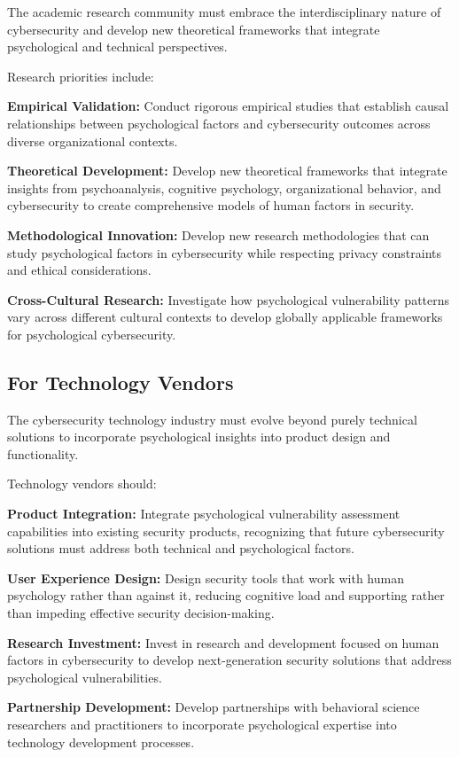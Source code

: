 \documentclass[10pt, twocolumn]{article}
\begin{document}
The academic research community must embrace the interdisciplinary nature of cybersecurity and develop new theoretical frameworks that integrate psychological and technical perspectives.

Research priorities include:

\textbf{Empirical Validation:} Conduct rigorous empirical studies that establish causal relationships between psychological factors and cybersecurity outcomes across diverse organizational contexts.

\textbf{Theoretical Development:} Develop new theoretical frameworks that integrate insights from psychoanalysis, cognitive psychology, organizational behavior, and cybersecurity to create comprehensive models of human factors in security.

\textbf{Methodological Innovation:} Develop new research methodologies that can study psychological factors in cybersecurity while respecting privacy constraints and ethical considerations.

\textbf{Cross-Cultural Research:} Investigate how psychological vulnerability patterns vary across different cultural contexts to develop globally applicable frameworks for psychological cybersecurity.

\subsection{For Technology Vendors}

The cybersecurity technology industry must evolve beyond purely technical solutions to incorporate psychological insights into product design and functionality.

Technology vendors should:

\textbf{Product Integration:} Integrate psychological vulnerability assessment capabilities into existing security products, recognizing that future cybersecurity solutions must address both technical and psychological factors.

\textbf{User Experience Design:} Design security tools that work with human psychology rather than against it, reducing cognitive load and supporting rather than impeding effective security decision-making.

\textbf{Research Investment:} Invest in research and development focused on human factors in cybersecurity to develop next-generation security solutions that address psychological vulnerabilities.

\textbf{Partnership Development:} Develop partnerships with behavioral science researchers and practitioners to incorporate psychological expertise into technology development processes.
\end{document}
